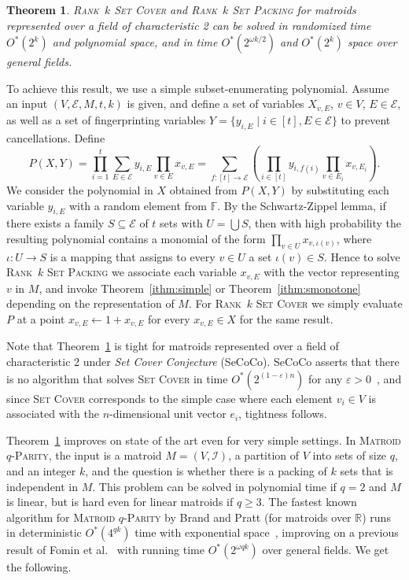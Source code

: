 \documentclass[10pt,a4paper]{article}
\newtheorem{theorem}{Theorem}[section]
\newcommand{\cI}{\ensuremath{\mathcal I}\xspace}
\newcommand{\cE}{\ensuremath{\mathcal E}\xspace}
\begin{document}
\begin{theorem} \label{ithm:setcover}
  \textsc{Rank~$k$ Set Cover} and \textsc{Rank~$k$ Set Packing} for
  matroids represented over a field of characteristic 2 can be solved
  in randomized time $O^*(2^k)$ and polynomial space,
  and in time $O^*(2^{\omega k / 2})$ and $O^*(2^k)$ space over general fields.
\end{theorem}

To achieve this result, we use a simple subset-enumerating polynomial.
Assume an input $(V,\cE,M,t,k)$ is given, and define a set of
variables $X_{v,E}$, $v \in V$, $E \in \cE$, as well as a set of
fingerprinting variables $Y=\{y_{i,E} \mid i \in [t], E \in \cE\}$
to prevent cancellations. Define
\[
  P(X,Y) = \prod_{i=1}^t \sum_{E \in \cE} y_{i,E} \prod_{v \in E} x_{v,E}
  = \sum_{f \colon [t] \to \cE} \left( \prod_{i \in [t]} y_{i,f(i)} \prod_{v\in E_i} x_{v,E_i} \right).
\]
We consider the polynomial in $X$ obtained from $P(X,Y)$ by substituting each variable $y_{i,E}$ with a random element from $\mathbb{F}$.
By the Schwartz-Zippel lemma, if there exists a family $S \subseteq \mathcal{E}$ of $t$ sets with $U = \bigcup S$, then with high probability the resulting polynomial contains a monomial of the form $\prod_{v \in U} x_{v,\iota(v)}$, where $\iota \colon U \to S$ is a mapping that assigns to every $v \in U$ a set $\iota(v) \in S$.
Hence to solve \textsc{Rank~$k$ Set Packing}
we associate each variable $x_{v,E}$ with the vector representing $v$
in $M$, and invoke Theorem~\ref{ithm:simple} or Theorem~\ref{ithm:smonotone}
depending on the representation of $M$. 
For \textsc{Rank~$k$ Set Cover} we simply evaluate $P$ at a point
$x_{v,E} \gets 1+x_{v,E}$ for every $x_{v,E} \in X$ for the same result.

Note that Theorem~\ref{ithm:setcover} is tight for matroids
represented over a field of characteristic 2 under \emph{Set Cover
  Conjecture} (SeCoCo).
SeCoCo asserts that there is
no algorithm that solves \textsc{Set Cover} in time $O^*(2^{(1-\varepsilon)n})$
for any $\varepsilon > 0$~\cite{CyganDLMNOPSW16seth}, and since
\textsc{Set Cover} corresponds to the simple case where each element
$v_i \in V$ is associated with the $n$-dimensional unit vector $e_i$,
tightness follows.

Theorem~\ref{ithm:setcover} improves on state of the art even for very
simple settings. In \textsc{Matroid $q$-Parity}, the input is a
matroid $M=(V,\cI)$, a partition of $V$ into sets of size $q$, 
and an integer $k$, and the question is whether there is a packing
of $k$ sets that is independent in $M$. This problem can be solved in
polynomial time if $q=2$ and $M$ is linear, but is hard even for
linear matroids if $q \geq 3$. The fastest known algorithm for
\textsc{Matroid $q$-Parity} by Brand and Pratt
(for matroids over $\mathbb{R}$)
runs in deterministic $O^*(4^{qk})$ time
with exponential space~\cite{BrandP21},
improving on a previous result of Fomin et al.~\cite{FominLPS16JACM}
with running time $O^*(2^{\omega q k})$
over general fields.
We get the following. 
\end{document}
